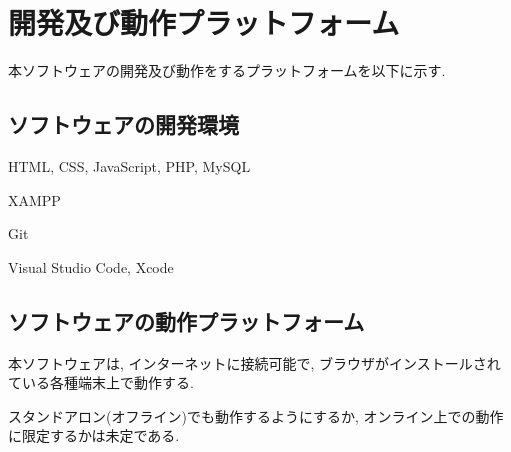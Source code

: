 \documentclass[11ptm]{jsarticle}
\begin{document}
\clearpage
\section{開発及び動作プラットフォーム}
\label{sec:開発及び動作プラットフォーム}
本ソフトウェアの開発及び動作をするプラットフォームを以下に示す.

\subsection{ソフトウェアの開発環境}
\label{subsec:ソフトウェアの開発環境}
\begin{description}[labelwidth=9em]
  \item[使用言語] HTML, CSS, JavaScript, PHP, MySQL
  \item[使用フレームワーク] XAMPP
  \item[使用ミドルウェア] Git
  \item[使用開発環境] Visual Studio Code, Xcode
\end{description}

\subsection{ソフトウェアの動作プラットフォーム}
\label{subsec:ソフトウェアの動作プラットフォーム}
本ソフトウェアは, インターネットに接続可能で, ブラウザがインストールされている各種端末上で動作する. \par
スタンドアロン(オフライン)でも動作するようにするか, オンライン上での動作に限定するかは未定である.


\clearpage
\end{document}
